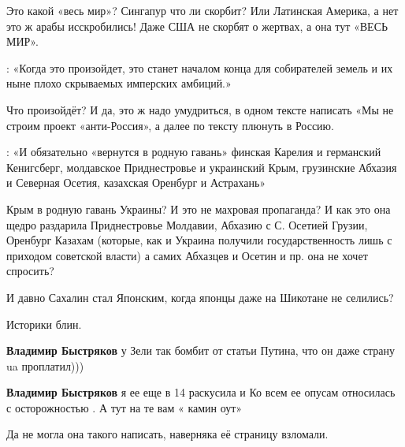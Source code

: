 \begin{itemize}
\begin{itemize}
Это какой «весь мир»? Сингапур что ли скорбит? Или Латинская Америка, а нет это
ж арабы исскробились! Даже США не скорбят о жертвах, а она тут «ВЕСЬ МИР».

: «Когда это произойдет, это станет началом конца для собирателей земель и их
ныне плохо скрываемых имперских амбиций.»

Что произойдёт? И да, это ж надо умудриться, в одном тексте написать «Мы не
строим проект «анти-Россия», а далее по тексту плюнуть в Россию.

: «И обязательно «вернутся в родную гавань» финская Карелия и германский
Кенигсберг, молдавское Приднестровье и украинский Крым, грузинские Абхазия и
Северная Осетия, казахская Оренбург и Астрахань»

Крым в родную гавань Украины? И это не махровая пропаганда? И как это она щедро
раздарила Приднестровье Молдавии, Абхазию с С. Осетией Грузии, Оренбург Казахам
(которые, как и Украина получили государственность лишь с приходом советской
власти) а самих Абхазцев и Осетин и пр. она не хочет спросить?

И давно Сахалин стал Японским, когда японцы даже на Шикотане не селились?

Историки блин.

 
\textbf{Владимир Быстряков} у Зели так бомбит от статьи Путина, что он даже страну ua проплатил)))

 
\textbf{Владимир Быстряков} я ее еще в 14 раскусила и Ко всем ее опусам относилась с осторожностью . А тут на те вам « камин оут»

 
Да не могла она такого написать, наверняка её страницу взломали.

 

\end{itemize}
\end{itemize}

